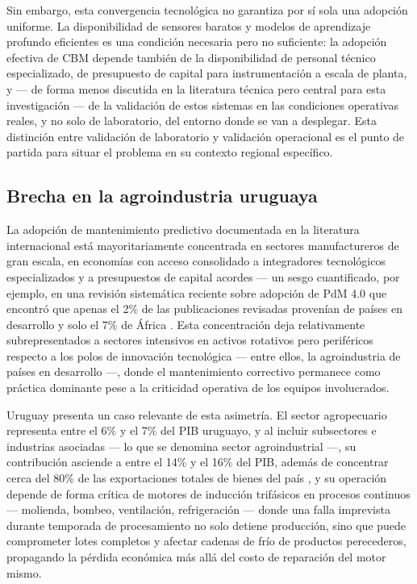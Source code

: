 \documentclass[11pt]{article}
\begin{document}
Sin embargo, esta convergencia tecnológica no garantiza por sí sola una adopción uniforme. La disponibilidad de sensores baratos y modelos de aprendizaje profundo eficientes es una condición necesaria pero no suficiente: la adopción efectiva de CBM depende también de la disponibilidad de personal técnico especializado, de presupuesto de capital para instrumentación a escala de planta, y --- de forma menos discutida en la literatura técnica pero central para esta investigación --- de la validación de estos sistemas en las condiciones operativas reales, y no solo de laboratorio, del entorno donde se van a desplegar. Esta distinción entre validación de laboratorio y validación operacional es el punto de partida para situar el problema en su contexto regional específico.

\subsection{Brecha en la agroindustria uruguaya}

La adopción de mantenimiento predictivo documentada en la literatura internacional está mayoritariamente concentrada en sectores manufactureros de gran escala, en economías con acceso consolidado a integradores tecnológicos especializados y a presupuestos de capital acordes --- un sesgo cuantificado, por ejemplo, en una revisión sistemática reciente sobre adopción de PdM 4.0 que encontró que apenas el 2\% de las publicaciones revisadas provenían de países en desarrollo y solo el 7\% de África \citep{peter2023}. Esta concentración deja relativamente subrepresentados a sectores intensivos en activos rotativos pero periféricos respecto a los polos de innovación tecnológica --- entre ellos, la agroindustria de países en desarrollo ---, donde el mantenimiento correctivo permanece como práctica dominante pese a la criticidad operativa de los equipos involucrados.

Uruguay presenta un caso relevante de esta asimetría. El sector agropecuario representa entre el 6\% y el 7\% del PIB uruguayo, y al incluir subsectores e industrias asociadas --- lo que se denomina sector agroindustrial ---, su contribución asciende a entre el 14\% y el 16\% del PIB, además de concentrar cerca del 80\% de las exportaciones totales de bienes del país \citep{uruguayxxi2024}, y su operación depende de forma crítica de motores de inducción trifásicos en procesos continuos --- molienda, bombeo, ventilación, refrigeración --- donde una falla imprevista durante temporada de procesamiento no solo detiene producción, sino que puede comprometer lotes completos y afectar cadenas de frío de productos perecederos, propagando la pérdida económica más allá del costo de reparación del motor mismo.
\end{document}
